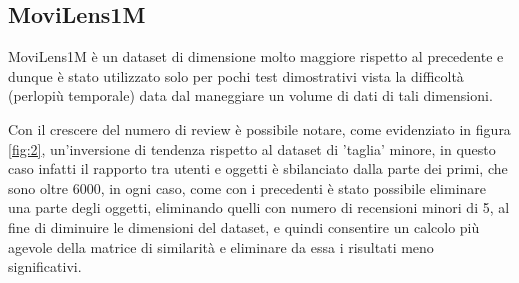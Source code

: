 \documentclass[12pt]{article}
\begin{document}
\subsection{MoviLens1M}
\label{MoviLens1M}

MoviLens1M è un dataset di dimensione molto maggiore rispetto al precedente e dunque è stato utilizzato solo per pochi test dimostrativi vista la difficoltà (perlopiù temporale) data dal maneggiare un volume di dati di tali dimensioni.

Con il crescere del numero di review è possibile notare, come evidenziato in figura \ref{fig:2}, un'inversione di tendenza rispetto al dataset di 'taglia' minore, in questo caso infatti il rapporto tra utenti e oggetti è sbilanciato dalla parte dei primi, che sono oltre $6000$, in ogni caso, come con i precedenti è stato possibile eliminare una parte degli oggetti, eliminando quelli con numero di recensioni minori di 5, al fine di diminuire le dimensioni del dataset, e quindi consentire un calcolo più agevole della matrice di similarità e eliminare da essa i risultati meno significativi.
\end{document}
